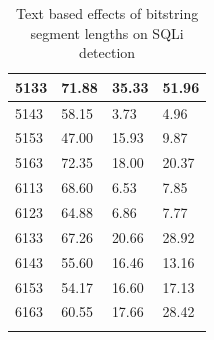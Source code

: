 \begin{appendices}
\begin{longtable}{|p{1.5in}|p{1in}|p{1in}|p{1in}|}
	5133 & 71.88 & 35.33 & 51.96 \\ \hline
	5143 & 58.15 &  3.73 &  4.96 \\ \hline
	5153 & 47.00 & 15.93 &  9.87 \\ \hline
	5163 & 72.35 & 18.00 & 20.37 \\ \hline
	6113 & 68.60 &  6.53 &  7.85 \\ \hline
	6123 & 64.88 &  6.86 &  7.77 \\ \hline
	6133 & 67.26 & 20.66 & 28.92 \\ \hline
	6143 & 55.60 & 16.46 & 13.16 \\ \hline
	6153 & 54.17 & 16.60 & 17.13 \\ \hline
	6163 & 60.55 & 17.66 & 28.42 \\ \hline
	\caption{Text based effects of bitstring segment lengths on SQLi detection}
\end{longtable}


\end{appendices}
